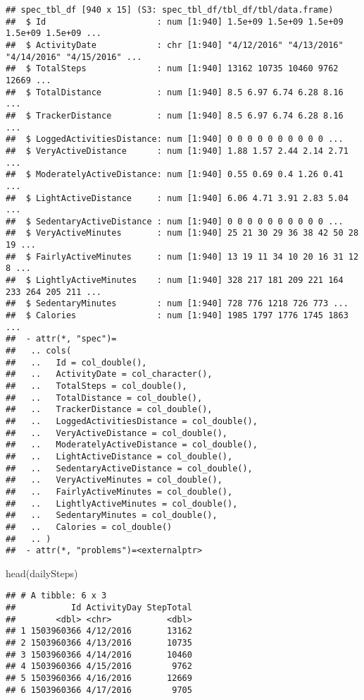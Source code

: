 \documentclass[
]{article}
\newenvironment{Shaded}{\begin{snugshade}}{\end{snugshade}}
\newcommand{\FunctionTok}[1]{\textcolor[rgb]{0.00,0.00,0.00}{#1}}
\newcommand{\NormalTok}[1]{#1}
\begin{document}
\begin{verbatim}
## spec_tbl_df [940 x 15] (S3: spec_tbl_df/tbl_df/tbl/data.frame)
##  $ Id                      : num [1:940] 1.5e+09 1.5e+09 1.5e+09 1.5e+09 1.5e+09 ...
##  $ ActivityDate            : chr [1:940] "4/12/2016" "4/13/2016" "4/14/2016" "4/15/2016" ...
##  $ TotalSteps              : num [1:940] 13162 10735 10460 9762 12669 ...
##  $ TotalDistance           : num [1:940] 8.5 6.97 6.74 6.28 8.16 ...
##  $ TrackerDistance         : num [1:940] 8.5 6.97 6.74 6.28 8.16 ...
##  $ LoggedActivitiesDistance: num [1:940] 0 0 0 0 0 0 0 0 0 0 ...
##  $ VeryActiveDistance      : num [1:940] 1.88 1.57 2.44 2.14 2.71 ...
##  $ ModeratelyActiveDistance: num [1:940] 0.55 0.69 0.4 1.26 0.41 ...
##  $ LightActiveDistance     : num [1:940] 6.06 4.71 3.91 2.83 5.04 ...
##  $ SedentaryActiveDistance : num [1:940] 0 0 0 0 0 0 0 0 0 0 ...
##  $ VeryActiveMinutes       : num [1:940] 25 21 30 29 36 38 42 50 28 19 ...
##  $ FairlyActiveMinutes     : num [1:940] 13 19 11 34 10 20 16 31 12 8 ...
##  $ LightlyActiveMinutes    : num [1:940] 328 217 181 209 221 164 233 264 205 211 ...
##  $ SedentaryMinutes        : num [1:940] 728 776 1218 726 773 ...
##  $ Calories                : num [1:940] 1985 1797 1776 1745 1863 ...
##  - attr(*, "spec")=
##   .. cols(
##   ..   Id = col_double(),
##   ..   ActivityDate = col_character(),
##   ..   TotalSteps = col_double(),
##   ..   TotalDistance = col_double(),
##   ..   TrackerDistance = col_double(),
##   ..   LoggedActivitiesDistance = col_double(),
##   ..   VeryActiveDistance = col_double(),
##   ..   ModeratelyActiveDistance = col_double(),
##   ..   LightActiveDistance = col_double(),
##   ..   SedentaryActiveDistance = col_double(),
##   ..   VeryActiveMinutes = col_double(),
##   ..   FairlyActiveMinutes = col_double(),
##   ..   LightlyActiveMinutes = col_double(),
##   ..   SedentaryMinutes = col_double(),
##   ..   Calories = col_double()
##   .. )
##  - attr(*, "problems")=<externalptr>
\end{verbatim}

\begin{Shaded}
\begin{Highlighting}[]
\FunctionTok{head}\NormalTok{(dailySteps)}
\end{Highlighting}
\end{Shaded}

\begin{verbatim}
## # A tibble: 6 x 3
##           Id ActivityDay StepTotal
##        <dbl> <chr>           <dbl>
## 1 1503960366 4/12/2016       13162
## 2 1503960366 4/13/2016       10735
## 3 1503960366 4/14/2016       10460
## 4 1503960366 4/15/2016        9762
## 5 1503960366 4/16/2016       12669
## 6 1503960366 4/17/2016        9705
\end{verbatim}
\end{document}
